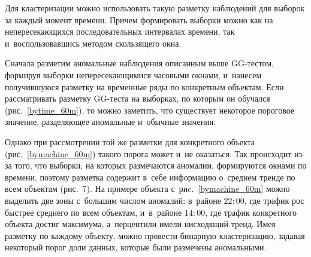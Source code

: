 \begin{multicols}{2}
Для кластеризации мож\-но использовать такую раз\-мет\-ку наблюдений для выборок за 
каж\-дый момент времени. Причем формировать вы\-бор\-ки можно как на не\-пе\-ре\-се\-ка\-ющих\-ся 
по\-сле\-до\-ва\-тель\-ных интервалах времени, так и~воспользовавшись методом сколь\-зя\-ще\-го 
\mbox{окна}.

Сначала разметим аномальные наблюдения описанным выше GG-тес\-том, формируя 
выборки не\-пе\-ре\-се\-ка\-ющи\-ми\-ся часовыми окнами, и~нанесем по\-лу\-чив\-шу\-юся раз\-мет\-ку на 
временн$\acute{\mbox{ы}}$е ряды по кон\-крет\-ным объектам.
Если рас\-смат\-ри\-вать разметку GG-тес\-та на выборках, по которым он обучал\-ся 
(рис.~\ref{bytime_60m}), то мож\-но заметить, что существует некоторое пороговое 
значение, раз\-де\-ля\-ющее аномальные и~обыч\-ные зна\-че\-ния.



Однако при рас\-смот\-ре\-нии той же раз\-мет\-ки для конкретного объекта 
(рис.~\ref{bymachine_60m}) такого порога может и~не оказаться. Так происходит из-за 
того, что вы\-бор\-ки, на которых раз\-ме\-ча\-ют\-ся аномалии, формируются окнами по 
времени, поэтому раз\-мет\-ка содержит в~себе информацию о~сред\-нем тренде по всем 
объектам (рис.~7). %
На примере объекта 
с~риc.~\ref{bymachine_60m} мож\-но выделить две зоны с~большим чис\-лом аномалий: 
в~районе $22{:}00$, где трафик рос быст\-рее сред\-не\-го по всем объектам, и~в~районе 
$14{:}00$, где трафик конкретного объекта до\-стиг максимума, а~пер\-цен\-ти\-ли имели 
нисходящий тренд.
Имея раз\-мет\-ку по каж\-до\-му объекту, мож\-но провести бинарную клас\-те\-ри\-за\-цию, задавая 
некоторый порог доли данных, которые были размечены ано\-маль\-ными.

\end{multicols}

\begin{figure*} %
\vspace*{-1pt}
\begin{center}
   \mbox{%
\epsfxsize=151.725mm 
}
\end{center}
\vspace*{-11pt}
 \label{bytime_ex1}
\vspace*{-7pt} 
\end{figure*}

